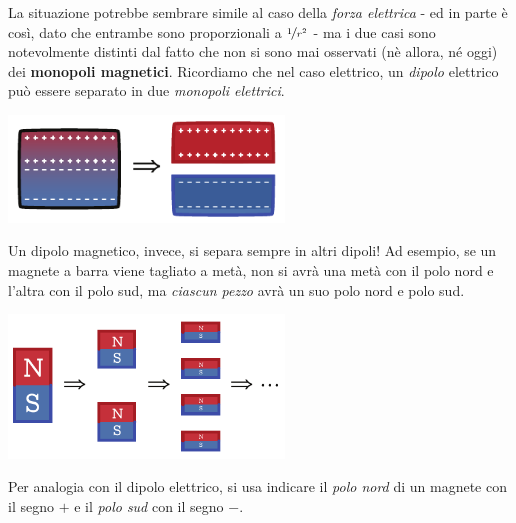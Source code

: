 La situazione potrebbe sembrare simile al caso della \textit{forza elettrica} - ed in parte è così, dato che entrambe sono proporzionali a $\nicefrac{1}{r^2}$ - ma i due casi sono notevolmente distinti dal fatto che non si sono mai osservati (nè allora, né oggi) dei \textbf{monopoli magnetici}. Ricordiamo che nel caso elettrico, un \textit{dipolo} elettrico può essere separato in due \textit{monopoli elettrici}.
\begin{center}
	\includegraphics[width=0.55\textwidth]{images/chp7/chp7assenzamonopoli1.pdf}
\end{center}
Un dipolo magnetico, invece, si separa sempre in altri dipoli! Ad esempio, se un magnete a barra viene tagliato a metà, non si avrà una metà con il polo nord e l'altra con il polo sud, ma \textit{ciascun pezzo} avrà un suo polo nord e polo sud.
\begin{center}
	\includegraphics[width=0.55\textwidth]{images/chp7/chp7assenzamonopoli2.pdf}
\end{center}
\begin{observe}
	Per analogia con il dipolo elettrico, si usa indicare il \textit{polo nord} di un magnete con il segno $+$ e il \textit{polo sud} con il segno $-$.
\end{observe}
